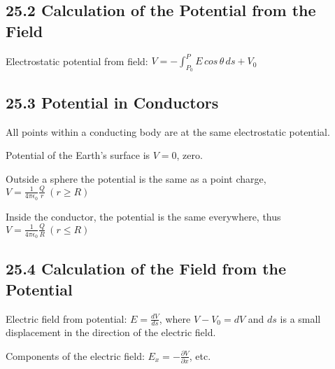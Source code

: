 \documentclass[twocolumn]{article}
\newenvironment{small_item}{
\begin{itemize}
  \setlength{\itemsep}{.25pt}
  \setlength{\parskip}{0pt}
  \setlength{\parsep}{0pt}
}{\end{itemize}}
\begin{document}
	\subsection*{25.2 Calculation of the Potential from the Field} %
	\label{sub:25_2_calculation_of_the_potential_from_the_field}
	\begin{small_item}
		\item Electrostatic potential from field: $V = -\int_{P_0}^P E\,cos\,\theta\,ds+V_0$
	\end{small_item}
	
	\subsection*{25.3 Potential in Conductors} %
	\label{sub:25_3_potential_in_conductors}
	
	\begin{small_item}
		\item All points within a conducting body are at the same electrostatic potential.
		\item Potential of the Earth's surface is $V = 0$, zero.
		\item Outside a sphere the potential is the same as a point charge,\\ $V = \frac{1}{4\pi\epsilon_0}\frac{Q}{r}\: (r \ge R)$
		\item Inside the conductor, the potential is the same everywhere, thus $V = \frac{1}{4\pi\epsilon_0}\frac{Q}{R}\: (r \le R)$
	\end{small_item}

	\subsection*{25.4 Calculation of the Field from the Potential} %
	\label{sub:25_4_calculation_of_the_field_from_the_potential}
	
	\begin{small_item}
		\item Electric field from potential: $E = \frac{dV}{ds}$, where $V - V_0 = dV$ and $ds$ is a small displacement in the direction of the electric field.
		\item Components of the electric field: $E_x = -\frac{\partial V}{\partial x}$, etc.
	\end{small_item}
	
\end{document}
